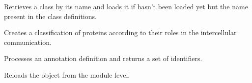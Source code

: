 \documentclass[letterpaper,10pt,english]{sphinxmanual}
\begin{document}
\begin{fulllineitems}
\begin{fulllineitems}
\end{fulllineitems}


\begin{fulllineitems}
\label{\detokenize{reference:pypath.annot.CustomAnnotation.get_class}}
Retrieves a class by its name and loads it if hasn’t been loaded yet
but the name present in the class definitions.

\end{fulllineitems}


\begin{fulllineitems}
\label{\detokenize{reference:pypath.annot.CustomAnnotation.populate_classes}}
Creates a classification of proteins according to their roles
in the intercellular communication.

\end{fulllineitems}


\begin{fulllineitems}
\label{\detokenize{reference:pypath.annot.CustomAnnotation.process_annot}}
Processes an annotation definition and returns a set of identifiers.

\end{fulllineitems}


\begin{fulllineitems}
\label{\detokenize{reference:pypath.annot.CustomAnnotation.reload}}
Reloads the object from the module level.

\end{fulllineitems}


\end{fulllineitems}
\end{document}
